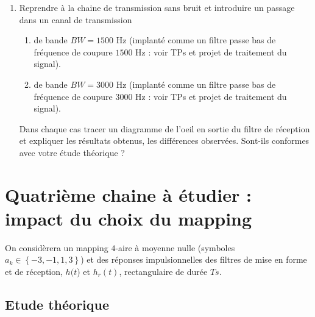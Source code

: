 \documentclass{article}
\begin{document}
\begin{enumerate}
        \item Reprendre à la chaine de transmission sans bruit et introduire un passage dans un canal de transmission
            \begin{enumerate}
                \item de bande $BW=1500$ Hz (implanté comme un filtre passe bas de fréquence de coupure $1500$ Hz : voir TPs et projet de traitement du signal).
                \item de bande $BW=3000$ Hz (implanté comme un filtre passe bas de fréquence de coupure $3000$ Hz : voir TPs et projet de traitement du signal).
            \end{enumerate}
            Dans chaque cas tracer un diagramme de l'oeil en sortie du filtre de réception et expliquer les résultats obtenus, les différences observées. Sont-ils conformes avec votre étude théorique ?
    \end{enumerate}

\section{Quatrième chaine à étudier : impact du choix du mapping}
On considèrera un mapping $4$-aire à moyenne nulle (symboles $a_k \in \left\{-3, -1, 1, 3\right\}$) et des réponses impulsionnelles des filtres de mise en forme et de réception, $h(t$) et $h_r(t)$, rectangulaire de durée $Ts$.

\subsection{Etude théorique}
\end{document}
